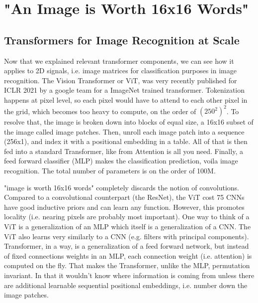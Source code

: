 \section{"An Image is Worth 16x16 Words"}

\subsection{Transformers for Image Recognition at Scale}

Now that we explained relevant transformer components, we can see how it applies to 2D signals, i.e. image matrices for classification purposes in image recognition.
The Vision Transformer or ViT, was very recently published for ICLR 2021 by a google team for a ImageNet trained transformer.
Tokenization happens at pixel level, so each pixel would have to attend to  each other pixel in the grid, which becomes too heavy to compute, on the order of $(250^2)^2$. 
To resolve that, the image is broken down into blocks of equal size, a 16x16 subset of the image called image patches. Then, unroll each image patch into a sequence (256x1), and index it with a positional embedding in a table. All of that is then fed into a standard Transformer, like from Attention is all you need. Finally, a feed forward classifier (MLP) makes the classification prediction, voila image recognition.
The total number of parameters is on the order of 100M.

"image is worth 16x16 words" completely discards the notion of convolutions. Compared to a convolutional counterpart (the ResNet), the ViT cost 75%
CNNs have good inductive priors and can learn any function. However, this promotes locality (i.e. nearing pixels are probably most important).
One way to think of a ViT is a generalization of an MLP which itself is a generalization of a CNN. The ViT also learns very similarly to a CNN (e.g. filters with principal components).
Transformer, in a way, is a generalization of a feed forward network, but instead of fixed connections weights in an MLP, each connection weight (i.e. attention) is computed on the fly. That makes the Transformer, unlike the MLP, permutation invariant. In that it wouldn't know where information is coming from unless there are additional learnable sequential positional embeddings, i.e. number down the image patches.

